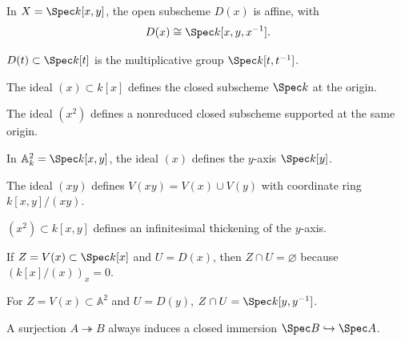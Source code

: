 \begin{example}\label{ex:vi22-e01}
In $X=\Spec k[x,y]$, the open subscheme $D(x)$ is affine, with
\[
D(x)\cong\Spec k[x,y,x^{-1}].
\]
\end{example}

\begin{example}\label{ex:vi22-e02}
$D(t)\subset\Spec k[t]$ is the multiplicative group $\Spec k[t,t^{-1}]$.
\end{example}

\begin{example}\label{ex:vi22-e03}
The ideal $(x)\subset k[x]$ defines the closed subscheme $\Spec k$ at the origin.
\end{example}

\begin{example}\label{ex:vi22-e04}
The ideal $(x^2)$ defines a nonreduced closed subscheme supported at the same origin.
\end{example}

\begin{example}\label{ex:vi22-e05}
In $\mathbb A^2_k=\Spec k[x,y]$, the ideal $(x)$ defines the $y$-axis $\Spec k[y]$.
\end{example}

\begin{example}\label{ex:vi22-e06}
The ideal $(xy)$ defines $V(xy)=V(x)\cup V(y)$ with coordinate ring $k[x,y]/(xy)$.
\end{example}

\begin{example}\label{ex:vi22-e07}
$(x^2)\subset k[x,y]$ defines an infinitesimal thickening of the $y$-axis.
\end{example}

\begin{example}\label{ex:vi22-e08}
If $Z=V(x)\subset\Spec k[x]$ and $U=D(x)$, then $Z\cap U=\varnothing$ because $(k[x]/(x))_x=0$.
\end{example}

\begin{example}\label{ex:vi22-e09}
For $Z=V(x)\subset\mathbb A^2$ and $U=D(y)$, $Z\cap U=\Spec k[y,y^{-1}]$.
\end{example}

\begin{example}\label{ex:vi22-e10}
A surjection $A\twoheadrightarrow B$ always induces a closed immersion $\Spec B\hookrightarrow\Spec A$.
\end{example}

